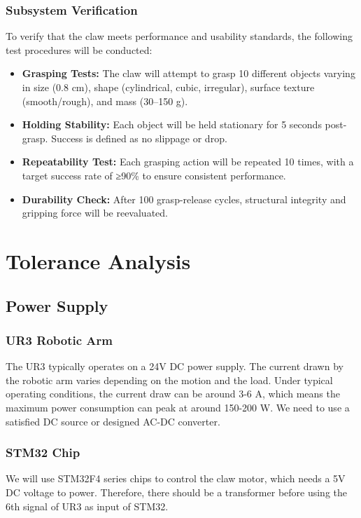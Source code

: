 \documentclass{senior-design}
\begin{document}
\subsubsection*{Subsystem Verification}
To verify that the claw meets performance and usability standards, the following test procedures will be conducted: 
\begin{itemize}
    \item \textbf{Grasping Tests:} The claw will attempt to grasp 10 different objects varying in size (0.8 cm), shape (cylindrical, cubic, irregular), surface texture (smooth/rough), and mass (30–150 g). 
    \item \textbf{Holding Stability:} Each object will be held stationary for 5 seconds post-grasp. Success is defined as no slippage or drop.     
    \item \textbf{Repeatability Test:} Each grasping action will be repeated 10 times, with a target success rate of ≥90\% to ensure consistent performance. 
    \item \textbf{Durability Check:} After 100 grasp-release cycles, structural integrity and gripping force will be reevaluated. 
\end{itemize}
\section{Tolerance Analysis}
\subsection{Power Supply}
\subsubsection{UR3 Robotic Arm}
The UR3 typically operates on a 24V DC power supply. The current drawn by the robotic arm varies depending on the motion and the load. Under typical operating conditions, the current draw can be around 3-6 A, which means the maximum power consumption can peak at around 150-200 W. We need to use a satisfied DC source or designed AC-DC converter. 
\subsubsection{STM32 Chip}
We will use STM32F4 series chips to control the claw motor, which needs a 5V DC voltage to power. Therefore, there should be a transformer before using the 6th signal of UR3 as input of STM32.  
\end{document}
